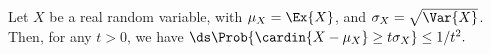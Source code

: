     \begin{theorem}
        Let $X$ be a real random variable, with $\mu_X = \Ex{X}$, and
        $\sigma_X = \sqrt{\Var{X}}$. Then, for any $t > 0$, we have
        \begin{math}
            \ds%
            \Prob{\bigl. \cardin{X - \mu_X} \geq t \sigma_X} \leq
            {1}/{t^2}.
        \end{math}
    \end{theorem}
